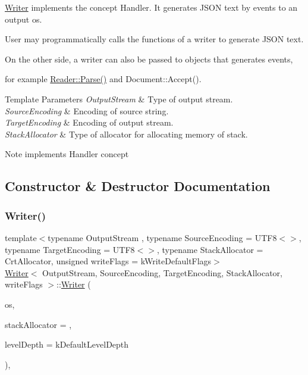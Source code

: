 \hyperlink{a02224}{Writer} implements the concept Handler. It generates J\+S\+ON text by events to an output os.

User may programmatically calls the functions of a writer to generate J\+S\+ON text.

On the other side, a writer can also be passed to objects that generates events,

for example \hyperlink{a02220_a0c450620d14ff1824e58bb7bd9b42099}{Reader\+::\+Parse()} and Document\+::\+Accept().


\begin{DoxyTemplParams}{Template Parameters}
{\em Output\+Stream} & Type of output stream. \\
\hline
{\em Source\+Encoding} & Encoding of source string. \\
\hline
{\em Target\+Encoding} & Encoding of output stream. \\
\hline
{\em Stack\+Allocator} & Type of allocator for allocating memory of stack. \\
\hline
\end{DoxyTemplParams}
\begin{DoxyNote}{Note}
implements Handler concept 
\end{DoxyNote}


\subsection{Constructor \& Destructor Documentation}
\mbox{\label{a02224_af4f54830d6927d9daf5bd53bfd134dd3}} 
\subsubsection{\texorpdfstring{Writer()}{Writer()}}
{\footnotesize\ttfamily template$<$typename Output\+Stream , typename Source\+Encoding  = U\+T\+F8$<$$>$, typename Target\+Encoding  = U\+T\+F8$<$$>$, typename Stack\+Allocator  = Crt\+Allocator, unsigned write\+Flags = k\+Write\+Default\+Flags$>$ \\
\hyperlink{a02224}{Writer}$<$ Output\+Stream, Source\+Encoding, Target\+Encoding, Stack\+Allocator, write\+Flags $>$\+::\hyperlink{a02224}{Writer} (\begin{DoxyParamCaption}\item[{Output\+Stream \&}]{os,  }\item[{Stack\+Allocator $\ast$}]{stack\+Allocator = {},  }\item[{size\+\_\+t}]{level\+Depth = {\ttfamily kDefaultLevelDepth} }\end{DoxyParamCaption})\hspace{0.3cm}{\ttfamily [inline]}, {\ttfamily [explicit]}}



